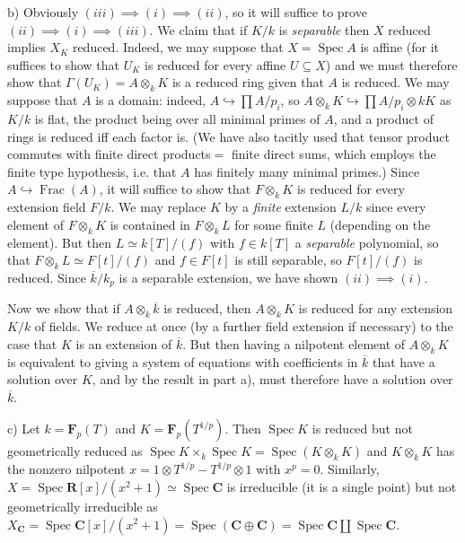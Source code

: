 \documentclass{report}
\newcommand{\R}{\mathbf{R}}
\newcommand{\C}{\mathbf{C}}
\newcommand{\FF}{\mathbf{F}}
\DeclareMathOperator{\Spec}{Spec}
\DeclareMathOperator{\Frac}{Frac}
\begin{document}
\noindent
b)	Obviously $(iii)\implies (i)\implies (ii)$, so it will suffice to prove $(ii)\implies (i)\implies (iii)$.   
We claim that if $K/k$ is {\em separable} then $X$ reduced implies $X_K$ reduced.
Indeed, we may suppose that $X=\Spec A$ is affine (for it suffices to show that $U_K$ is reduced
for every affine $U\subseteq X$) and we must therefore show that $\Gamma(U_K)=A\otimes_k K$ is a reduced
ring given that $A$ is reduced.  We may suppose that $A$ is a domain: indeed, $A\hookrightarrow \prod A/p_i$,
so $A\otimes_k K\hookrightarrow \prod A/p_i\otimes k K$ as $K/k$ is flat,
the product being over all minimal primes of $A$, and a product of rings is reduced iff each factor is.  (We have
also tacitly used that tensor product commutes with finite direct products$=$ finite direct sums, which employs
the finite type hypothesis, i.e. that $A$ has finitely many minimal primes.)		
Since $A\hookrightarrow \Frac(A)$, it will suffice to show that $F\otimes_k K$ is reduced for every extension field $F/k$.
We may replace $K$ by a {\em finite} extension $L/k$ since every element of $F\otimes_k K$ is contained in $F\otimes_k L$
for some finite $L$ (depending on the element).	But then $L\simeq k[T]/(f)$ with $f\in k[T]$ a {\em separable} polynomial,
so that $F\otimes_k L\simeq F[t]/(f)$ and $f\in F[t]$ is still separable, so $F[t]/(f)$ is reduced.
Since $\overline{k}/k_p$ is a separable extension, we have shown $(ii)\implies (i)$.

Now we show that if $A\otimes_k \overline{k}$ is reduced, then $A\otimes_k K$ is reduced for any extension
$K/k$ of fields.  We reduce at once (by a further field extension if necessary) to the case
that $K$ is an extension of $\overline{k}$.	But then having a nilpotent element of $A\otimes_k K$
is equivalent to giving a system of equations with coefficients in $\overline{k}$ that have a solution
over $K$, and by the result in part a), must therefore have a solution over $\overline{k}$.

\noindent
c)	Let $k=\FF_p(T)$ and $K=\FF_p(T^{1/p})$.  Then $\Spec K$ is reduced but not geometrically reduced
as $\Spec K\times_k \Spec K=\Spec(K\otimes_k K)$ and $K\otimes_k K$ has the nonzero nilpotent
$x=1\otimes T^{1/p}-T^{1/p}\otimes 1$ with $x^p=0$.
Similarly, $X=\Spec \R[x]/(x^2+1)\simeq \Spec \C$ is irreducible (it is a single point) but not geometrically irreducible
as $X_{\C}=\Spec \C[x]/(x^2+1)=\Spec (\C\oplus \C)=\Spec \C \coprod \Spec \C$. 

 
\section{}
\end{document}
